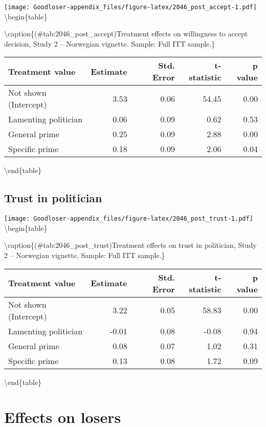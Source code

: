 \documentclass[
]{book}
\begin{document}
\texttt{[image: Goodloser-appendix\_files/figure-latex/2046\_post\_accept-1.pdf]} \textbackslash begin\{table\}

\textbackslash caption\{(\#tab:2046\_post\_accept)Treatment effects on willingness to accept decision, Study 2 -- Norwegian vignette. Sample: Full ITT sample.\}
\centering

\begin{tabular}[t]{lrrrr}
\toprule
Treatment value & Estimate & Std. Error & t-statistic & p value\\
\midrule
Not shown (Intercept) & 3.53 & 0.06 & 54.45 & 0.00\\
Lamenting politician & 0.06 & 0.09 & 0.62 & 0.53\\
General prime & 0.25 & 0.09 & 2.88 & 0.00\\
Specific prime & 0.18 & 0.09 & 2.06 & 0.04\\
\bottomrule
\end{tabular}

\textbackslash end\{table\}

\hypertarget{trust-in-politician-2}{%
\section{Trust in politician}\label{trust-in-politician-2}}

\texttt{[image: Goodloser-appendix\_files/figure-latex/2046\_post\_trust-1.pdf]} \textbackslash begin\{table\}

\textbackslash caption\{(\#tab:2046\_post\_trust)Treatment effects on trust in politician, Study 2 -- Norwegian vignette. Sample: Full ITT sample.\}
\centering

\begin{tabular}[t]{lrrrr}
\toprule
Treatment value & Estimate & Std. Error & t-statistic & p value\\
\midrule
Not shown (Intercept) & 3.22 & 0.05 & 58.83 & 0.00\\
Lamenting politician & -0.01 & 0.08 & -0.08 & 0.94\\
General prime & 0.08 & 0.07 & 1.02 & 0.31\\
Specific prime & 0.13 & 0.08 & 1.72 & 0.09\\
\bottomrule
\end{tabular}

\textbackslash end\{table\}

\hypertarget{effects-on-losers-1}{%
\chapter{Effects on losers}\label{effects-on-losers-1}}
\end{document}
